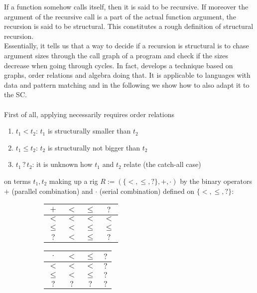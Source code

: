 If a function somehow calls itself, then it is said to be recursive.
If moreover the argument of the recursive call is a part of the actual function argument, the recursion is said to be structural.
This constitutes a rough definition of structural recursion.
\\
Essentially, it tells us that a way to decide if a recursion is structural is to chase argument sizes through the call graph of a program and check if the sizes decrease when going through cycles.
In fact, \cite{Abel2002foetusT} develops a technique based on graphs, order relations and algebra doing that.
It is applicable to languages with data and pattern matching and in the following we show how to also adapt it to the SC.
\\
\\
First of all, applying \cite{Abel2002foetusT} necessarily requires order relations
\begin{enumerate}
  \item
    $t_{1} < t_{2}$: $t_{1}$ is structurally smaller than $t_{2}$
  \item
    $t_{1} \leq t_{2}$: $t_{2}$ is structurally not bigger than $t_{2}$
  \item
    $t_{1} \, ? \, t_{2}$: it is unknown how $t_{1}$ and $t_{2}$ relate (the catch-all case)
\end{enumerate}
on terms $t_{1}, t_{2}$ making up a rig $R :=( \{ <,\leq,? \},+,\cdot )$ by the binary operators $+$ (parallel combination) and $\cdot$ (serial combination) defined on $\{ <,\leq,? \}$:

\begin{figure}[H]
  \begin{subfigure}[t]{0.3\textwidth}
    \scriptsize
    \begin{tabular}{c|ccc}
        $+$
      & $<$
      & $\leq$
      & $?$
      \\
      \hline
        $<$
      & $<$
      & $<$
      & $<$
      \\
        $\leq$
      & $<$
      & $\leq$ &
      $\leq$
      \\
        $?$
      & $<$
      & $\leq$
      & $?$
      \\
    \end{tabular}
  \end{subfigure}
  \begin{subfigure}[t]{0.3\textwidth}
    \scriptsize
    \begin{tabular}{c|ccc}
        $\cdot$
      & $<$
      & $\leq$
      & $?$
      \\
      \hline
        $<$
      & $<$
      & $<$
      & $?$
      \\
        $\leq$
      & $<$
      & $\leq$
      & $?$
      \\
        $?$
      & $?$
      & $?$
      & $?$
      \\
    \end{tabular}
  \end{subfigure}
\end{figure}

